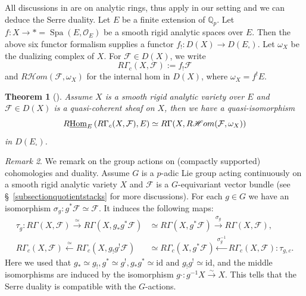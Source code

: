 \documentclass[a4paper,10pt]{amsart}
\newtheorem{theorem}{Theorem}[section]
\theoremstyle{remark}
\newtheorem{remark}[theorem]{Remark}
\theoremstyle{definition}
\theoremstyle{plain}
\numberwithin{equation}{section}
\newcommand{\bbQ}{{\mathbb Q}}
\newcommand{\calF}{{\mathcal F}}
\newcommand{\calO}{{\mathcal O}}
\newcommand{\Hom}{{\rm Hom}}
\newcommand{\uHom}{\underline{\Hom}}
\DeclareMathOperator{\Spa}{Spa}
\begin{document}
All discussions in \cite[\S~3.6]{camargo2024analytic} are on analytic rings, thus apply in our setting and we can deduce the Serre duality. Let $E$ be a finite extension of $\bbQ_p$. Let $f:X\rightarrow *=\Spa(E,\calO_E)$ be a smooth rigid analytic spaces over $E$. Then the above six functor formalism supplies a functor $f_!:D(X)\rightarrow D(E_{\square})$. Let $\omega_X$ be the dualizing complex of $X$. For $\calF\in D(X)$, we write 
\[R\Gamma_c(X,\calF):=f_!\calF\] 
and $R\mathscr{H}om(\calF,\omega_X)$ for the internal hom in $D(X)$, where $\omega_X=f^!E$.
\begin{theorem}[{\cite[Thm.~3.6.15]{camargo2024analytic}}]\label{theoremserreduality}
  	Assume $X$ is a smooth rigid analytic variety over $E$ and $\calF\in D(X)$ is a quasi-coherent sheaf on $X$, then we have a quasi-isomorphism
  	\[R\uHom_E\left(R\Gamma_c(X,\calF),E\right)\simeq R\Gamma(X,R\mathscr{H}om(\calF,\omega_X))\]
	in $D(E_\square)$.
  \end{theorem}  
  
\begin{remark}\label{remarkgroupaction}
	We remark on the group actions on (compactly supported) cohomologies and duality. Assume $G$ is a $p$-adic Lie group acting continuously on a smooth rigid analytic variety $X$ and $\calF$ is a $G$-equivariant vector bundle (see \S~\ref{subsectionquotientstacks} for more discussions). For each $g\in G$ we have an isomorphism $\sigma_g:g^*\calF\simeq \calF$. It induces the following maps:
	\begin{equation*}
	\begin{aligned}
		\tau_g: R\Gamma(X,\calF)\stackrel{\simeq}\to R\Gamma(X,g_*g^*\calF)&\simeq R\Gamma(X,g^*\calF)\stackrel{\sigma_g}\longrightarrow R\Gamma(X,\calF),\\
		R\Gamma_c(X,\calF)\stackrel{\simeq}\leftarrow R\Gamma_c(X,g_!g^!\calF)&\simeq R\Gamma_c(X,g^*\calF)\stackrel{\sigma_g^{-1}}\longleftarrow R\Gamma_c(X,\calF):\tau_{g,c}.
	\end{aligned}
	\end{equation*}
	Here we used that $g_*\simeq g_!,g^*\simeq g^!, g_*g^*\simeq \mathrm{id}$ and $g_!g^!\simeq \mathrm{id}$, and the middle isomorphisms are induced by the isomorphism $g\cdot:g^{-1}X\xrightarrow{\sim} X$. This tells that the Serre duality is compatible with the $G$-actions.
\end{remark}
\end{document}
